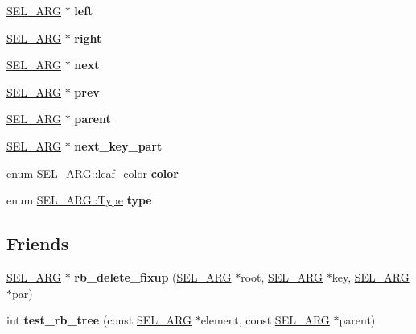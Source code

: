 \begin{DoxyCompactItemize}
\mbox{\hyperlink{classSEL__ARG}{S\+E\+L\+\_\+\+A\+RG}} $\ast$ {\bfseries left}
\item 
\mbox{\label{classSEL__ARG_a8acf7afaac61e5ff40ccb4860c7d36d7}} 
\mbox{\hyperlink{classSEL__ARG}{S\+E\+L\+\_\+\+A\+RG}} $\ast$ {\bfseries right}
\item 
\mbox{\label{classSEL__ARG_ab3e9169a682eb71a75d52da8a9ff54f0}} 
\mbox{\hyperlink{classSEL__ARG}{S\+E\+L\+\_\+\+A\+RG}} $\ast$ {\bfseries next}
\item 
\mbox{\label{classSEL__ARG_a5830ac0f16ce1fc100ff798e20926f1a}} 
\mbox{\hyperlink{classSEL__ARG}{S\+E\+L\+\_\+\+A\+RG}} $\ast$ {\bfseries prev}
\item 
\mbox{\label{classSEL__ARG_a639b22fb5e18d8b5266b04d9dfc67f2e}} 
\mbox{\hyperlink{classSEL__ARG}{S\+E\+L\+\_\+\+A\+RG}} $\ast$ {\bfseries parent}
\item 
\mbox{\label{classSEL__ARG_a6b2cbaa7869e815c0db9d29712527612}} 
\mbox{\hyperlink{classSEL__ARG}{S\+E\+L\+\_\+\+A\+RG}} $\ast$ {\bfseries next\+\_\+key\+\_\+part}
\item 
\mbox{\label{classSEL__ARG_a9da903b7636f2faec727623b0299307d}} 
enum S\+E\+L\+\_\+\+A\+R\+G\+::leaf\+\_\+color {\bfseries color}
\item 
\mbox{\label{classSEL__ARG_a1b65aba3b657f7f27e1052a1bd463541}} 
enum \mbox{\hyperlink{classSEL__ARG_ac3c2b193f810aece693ca18c6a1a9312}{S\+E\+L\+\_\+\+A\+R\+G\+::\+Type}} {\bfseries type}
\end{DoxyCompactItemize}
\subsection*{Friends}
\begin{DoxyCompactItemize}
\item 
\mbox{\label{classSEL__ARG_a54d8d8d08b26f57d2690a4967f4292bc}} 
\mbox{\hyperlink{classSEL__ARG}{S\+E\+L\+\_\+\+A\+RG}} $\ast$ {\bfseries rb\+\_\+delete\+\_\+fixup} (\mbox{\hyperlink{classSEL__ARG}{S\+E\+L\+\_\+\+A\+RG}} $\ast$root, \mbox{\hyperlink{classSEL__ARG}{S\+E\+L\+\_\+\+A\+RG}} $\ast$key, \mbox{\hyperlink{classSEL__ARG}{S\+E\+L\+\_\+\+A\+RG}} $\ast$par)
\item 
\mbox{\label{classSEL__ARG_a7e8beb97bae1d6e74bb63764aeaaf07b}} 
int {\bfseries test\+\_\+rb\+\_\+tree} (const \mbox{\hyperlink{classSEL__ARG}{S\+E\+L\+\_\+\+A\+RG}} $\ast$element, const \mbox{\hyperlink{classSEL__ARG}{S\+E\+L\+\_\+\+A\+RG}} $\ast$parent)
\end{DoxyCompactItemize}
